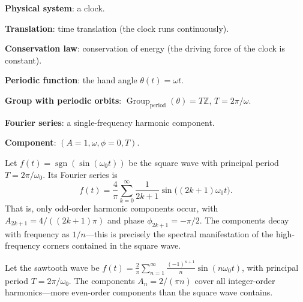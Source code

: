 \begin{example}\label{ex:clock_modelling}
\textbf{Physical system}: a clock.

\textbf{Translation}: time translation (the clock runs continuously).

\textbf{Conservation law}: conservation of energy (the driving force of the clock is constant).

\textbf{Periodic function}: the hand angle $\theta(t) = \omega t$.

\textbf{Group with periodic orbits}: $\operatorname{Group}_{\mathrm{period}}(\theta) = T\mathbb{Z}$, $T = 2\pi/\omega$.

\textbf{Fourier series}: a single-frequency harmonic component.

\textbf{Component}: $(A=1, \omega, \phi=0, T)$.
\end{example}

\begin{example}\label{ex:square_wave_fourier}
Let $f(t)=\operatorname{sgn}(\sin(\omega_0 t))$ be the square wave with principal period $T=2\pi/\omega_0$. Its Fourier series is
\[
f(t) = \frac{4}{\pi}\sum_{k=0}^{\infty} \frac{1}{2k+1}\sin\bigl((2k+1)\omega_0 t\bigr).
\]
That is, only odd-order harmonic components occur, with $A_{2k+1} = 4/((2k+1)\pi)$ and phase $\phi_{2k+1}=-\pi/2$. The components decay with frequency as $1/n$---this is precisely the spectral manifestation of the high-frequency corners contained in the square wave.
\end{example}

\begin{example}\label{ex:sawtooth_fourier}
Let the sawtooth wave be $f(t)=\frac{2}{\pi}\sum_{n=1}^\infty\frac{(-1)^{n+1}}{n}\sin(n\omega_0 t)$, with principal period $T=2\pi/\omega_0$. The components $A_n = 2/(\pi n)$ cover all integer-order harmonics---more even-order components than the square wave contains.
\end{example}

